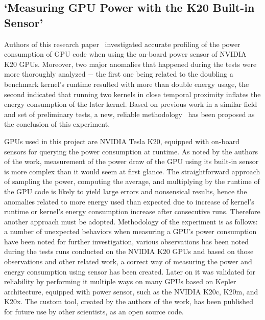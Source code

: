 \subsection{`Measuring GPU Power with the K20 Built-in Sensor'}

Authors of this research paper~\cite{State_of_the_Art_Article_3}
investigated accurate profiling of the power consumption of
GPU code when using the on-board power sensor of NVIDIA K20 GPUs.
Moreover, two major anomalies that happened during the tests
were more thoroughly analyzed $-$ the first one being related to
the doubling a benchmark kernel's runtime resulted with more
than double energy usage, the second indicated that running two
kernels in close temporal proximity inflates the energy
consumption of the later kernel. Based on previous work in
a similar field and set of preliminary tests, a new, reliable
methodology~\cite{K20Power} has been proposed as the conclusion
of this experiment.

GPUs used in this project are NVIDIA Tesla K20, equipped with
on-board sensors for querying the power consumption at runtime.
As noted by the authors of the work, measurement of the power draw
of the GPU using its built-in sensor is more complex than it would
seem at first glance. The straightforward approach of sampling the
power, computing the average, and multiplying by the runtime of the
GPU code is likely to yield large errors and nonsensical results,
hence the anomalies related to more energy used than expected due
to increase of kernel's runtime or kernel's energy consumption
increase after consecutive runs. Therefore another approach must
be adopted. Methodology of the experiment is as follows: a number
of unexpected behaviors when measuring a GPU's power consumption
have been noted for further investigation, various observations
has been noted during the tests runs conducted on the NVIDIA K20
GPUs and based on those observations and other related work,
a correct way of measuring the power and energy consumption using
sensor has been created. Later on it was validated for reliability
by performing it multiple ways on many GPUs based on Kepler
architecture, equipped with power sensor, such as the NVIDIA K20c,
K20m, and K20x. The custom tool, created by the authors of the
work, has been published for future use by other scientists, as an
open source code.

